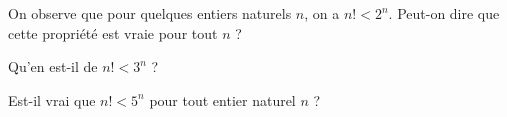 On observe que pour quelques entiers naturels $n$, on a
$n! < 2^n$. Peut-on dire que cette propriété est vraie pour tout $n$ ?

Qu'en est-il de $n! < 3^n$ ?

Est-il vrai que $n! < 5^n$ pour tout entier naturel $n$ ?
